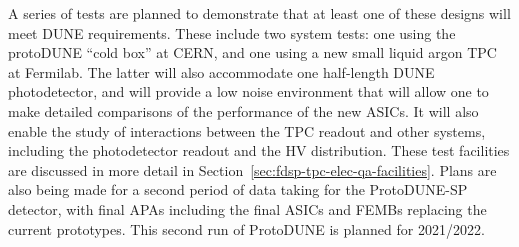 A series of tests are planned to demonstrate that at least one of these designs will meet DUNE requirements. These include two system tests: one using the protoDUNE ``cold box'' at CERN, and one using a new small liquid argon TPC at Fermilab. The latter will also accommodate one half-length DUNE photodetector, and will provide a low noise environment that will allow one to make detailed comparisons of the performance of the new ASICs. It will also enable the study of interactions between the TPC readout and other systems, including the photodetector readout and the HV distribution. These test facilities are discussed in more detail in Section~\ref{sec:fdsp-tpc-elec-qa-facilities}. Plans are also being made for a second period of data taking for the ProtoDUNE-SP detector, with final APAs including the final ASICs and FEMBs replacing the current prototypes. This second run of ProtoDUNE is planned for 2021/2022.

